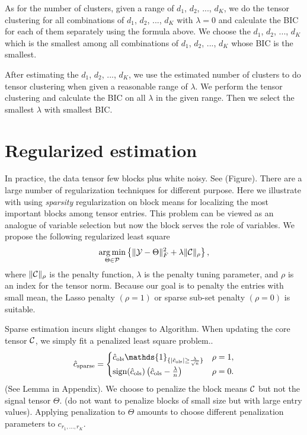 \documentclass{article}
\begin{document}
As for the number of clusters, given a range of $d_1$, $d_2$, ..., $d_K$, we do the tensor clustering for all combinations of $d_1$, $d_2$, ..., $d_K$ with $\lambda=0$ and calculate the BIC for each of them separately using the formula above. We choose the $d_1$, $d_2$, ..., $d_K$ which is the smallest among all combinations of $d_1$, $d_2$, ..., $d_K$ whose BIC is the smallest. \par

After estimating the $d_1$, $d_2$, ..., $d_K$, we use the estimated number of clusters to do tensor clustering when given a reasonable range of $\lambda$. We perform the tensor clustering and calculate the BIC on all $\lambda$ in the given range. Then we select the smallest $\lambda$ with smallest BIC.



\section{Regularized estimation}
In practice, the data tensor few blocks plus white noisy. See (Figure). There are a large number of regularization techniques for different purpose. Here we illustrate with using \emph{sparsity} regularization on block means for localizing the most important blocks among tensor entries. This problem can be viewed as an analogue of variable selection but now the block serves the role of variables. We propose the following regularized least square 
\[
\operatorname*{arg\,min}_{\Theta\in \mathcal{P}}\left\{\lVert\mathcal{Y}-\Theta\rVert_F^2+\lambda \lVert\mathcal{C}\rVert_\rho
\right\},
\]
where $\lVert\mathcal{C}\rVert_\rho$ is the penalty function, $\lambda$ is the penalty tuning parameter, and $\rho$ is an index for the tensor norm. Because our goal is to penalty the entries with small mean, the Lasso penalty $(\rho=1)$ or sparse sub-set penalty $(\rho=0)$ is suitable. 

Sparse estimation incurs slight changes to Algorithm. When updating the core tensor $\mathcal{C}$, we simply fit a penalized least square problem..
\[
\hat c_{\text{sparse}}=
\begin{cases}
\hat c_{\text{ols}}\mathds{1}_{\{|\hat c_{\text{ols}} |\geq {\lambda \over \sqrt{n}}\}}& \rho=1,\\
\text{sign}(\hat c_{\text{ols}})\left( \hat c_{\text{ols}}-{\lambda \over n}  \right) &\rho=0.
\end{cases}
\]
(See Lemma in Appendix). 
We choose to penalize the block means $\mathcal{C}$ but not the signal tensor $\Theta$. (do not want to penalize blocks of small size but with large entry values). Applying penalization to $\Theta$ amounts to choose different penalization parameters to $c_{r_1,\ldots,r_K}$.  
\end{document}

